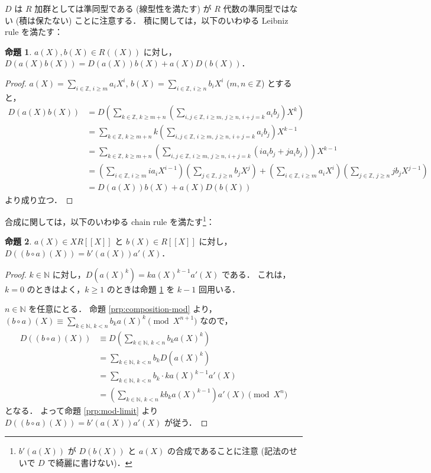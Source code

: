 \documentclass{jsarticle}
\newcommand{\N}{\mathbb{N}}
\newcommand{\Z}{\mathbb{Z}}
\theoremstyle{definition}
\newtheorem{Prp}{命題}
\newenvironment{prp}{\vspace{1ex}\begin{screen}\begin{Prp}}{\end{Prp}\end{screen}}
\newenvironment{prf}{\begin{leftbar}\begin{proof}}{\end{proof}\end{leftbar}}
\begin{document}
$D$ は $R$ 加群としては準同型である (線型性を満たす) が
$R$ 代数の準同型ではない (積は保たない) ことに注意する．
積に関しては，以下のいわゆる Leibniz rule を満たす：

\begin{prp}
  \label{prp:leibniz}
  $a(X), b(X) \in R((X))$ に対し，$D(a(X) b(X)) = D(a(X)) b(X) + a(X) D(b(X))$．
\end{prp}
\begin{prf}
  $a(X) = \sum_{i\in\Z,\,i\ge m} a_i X^i$, $b(X) = \sum_{i\in\Z,\,i\ge n} b_i X^i$ ($m, n \in \Z$) とすると，
  \begin{align*}
    D(a(X) b(X))
    &= D\left(\sum_{k\in\Z,\,k\ge m+n} \left(\sum_{i,j\in\Z,\,i\ge m,\,j\ge n,\,i+j=k} a_i b_j\right) X^k\right) \\
    &= \sum_{k\in\Z,\,k\ge m+n} k \left(\sum_{i,j\in\Z,\,i\ge m,\,j\ge n,\,i+j=k} a_i b_j\right) X^{k-1} \\
    &= \sum_{k\in\Z,\,k\ge m+n} \left(\sum_{i,j\in\Z,\,i\ge m,\,j\ge n,\,i+j=k} (i a_i b_j + j a_i b_j)\right) X^{k-1} \\
    &= \left(\sum_{i\in\Z,\,i\ge m} i a_i X^{i-1}\right) \left(\sum_{j\in\Z,\,j\ge n} b_j X^j\right)
        + \left(\sum_{i\in\Z,\,i\ge m} a_i X^i\right) \left(\sum_{j\in\Z,\,j\ge n} j b_j X^{j-1}\right) \\
    &= D(a(X)) b(X) + a(X) D(b(X))
  \end{align*}
  より成り立つ．
\end{prf}

合成に関しては，以下のいわゆる chain rule を満たす\footnote{$b'(a(X))$ が $D(b(X))$ と $a(X)$ の合成であることに注意 (記法のせいで $D$ で綺麗に書けない)．}：

\begin{prp}
  $a(X) \in X R[[X]]$ と $b(X) \in R[[X]]$ に対し，
  $D((b \circ a)(X)) = b'(a(X)) a'(X)$．
\end{prp}
\begin{prf}
  $k \in \N$ に対し，$D(a(X)^k) = k a(X)^{k-1} a'(X)$ である．
  これは，$k = 0$ のときはよく，$k \ge 1$ のときは命題 \ref{prp:leibniz} を $k - 1$ 回用いる．

  $n \in \N$ を任意にとる．
  命題 \ref{prp:composition-mod} より，
  $(b \circ a)(X) \equiv \sum_{k\in\N,\,k<n} b_k a(X)^k \pmod{X^{n+1}}$ なので，
  \begin{align*}
    D((b \circ a)(X))
    &\equiv D\left(\sum_{k\in\N,\,k<n} b_k a(X)^k\right) \\
    &= \sum_{k\in\N,\,k<n} b_k D(a(X)^k) \\
    &= \sum_{k\in\N,\,k<n} b_k \cdot k a(X)^{k-1} a'(X) \\
    &= \left(\sum_{k\in\N,\,k<n} k b_k a(X)^{k-1}\right) a'(X)
    \pmod{X^n}
  \end{align*}
  となる．
  よって命題 \ref{prp:mod-limit} より $D((b \circ a)(X)) = b'(a(X)) a'(X)$ が従う．
\end{prf}
\end{document}
